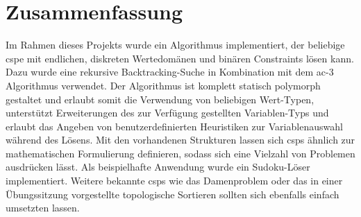 \section{Zusammenfassung}
Im Rahmen dieses Projekts wurde ein Algorithmus implementiert, der beliebige \acl*{csp}e mit endlichen, diskreten Wertedomänen und binären Constraints lösen kann. Dazu wurde eine
rekursive Backtracking-Suche in Kombination mit dem \ac*{ac}-3 Algorithmus verwendet. Der Algorithmus ist komplett statisch polymorph gestaltet und erlaubt somit die Verwendung von
beliebigen Wert-Typen, unterstützt Erweiterungen des zur Verfügung gestellten Variablen-Typs und erlaubt das Angeben von benutzerdefinierten Heuristiken zur Variablenauswahl während
des Lösens. Mit den vorhandenen Strukturen lassen sich \acp{csp} ähnlich zur mathematischen Formulierung definieren, sodass sich eine Vielzahl von Problemen ausdrücken lässt. Als
beispielhafte Anwendung wurde ein Sudoku-Löser implementiert. Weitere bekannte \acp{csp} wie das Damenproblem oder das in einer Übungssitzung vorgestellte topologische Sortieren
sollten sich ebenfalls einfach umsetzten lassen.